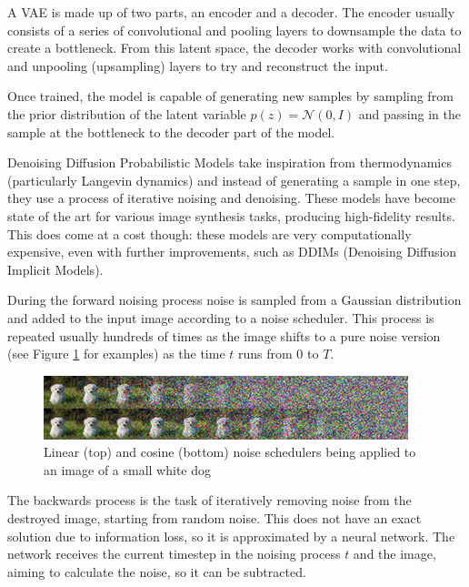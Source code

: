 	A VAE is made up of two parts, an encoder and a decoder. The encoder usually consists of a series of convolutional and pooling layers to downsample the data to create a bottleneck. From this latent space, the decoder works with convolutional and unpooling (upsampling) layers to try and reconstruct the input. 
	
	Once trained, the model is capable of generating new samples by sampling from the prior distribution of the latent variable $p(z) = \mathcal{N}(0,I)$ and passing in the sample at the bottleneck to the decoder part of the model.
	
	Denoising Diffusion Probabilistic Models take inspiration from thermodynamics (particularly Langevin dynamics\cite{welling2011bayesian}) and instead of generating a sample in one step, they use a process of iterative noising and denoising\cite{ho2020denoising}. These models have become state of the art for various image synthesis tasks, producing high-fidelity results. This does come at a cost though: these models are very computationally expensive, even with further improvements, such as DDIMs (Denoising Diffusion Implicit Models\cite{song2020denoising}).
	
	During the forward noising process noise is sampled from a Gaussian distribution and added to the input image according to a noise scheduler. This process is repeated usually hundreds of times as the image shifts to a pure noise version (see Figure \ref{fig:scheduler} for examples) as the time $t$ runs from 0 to $T$.
	
	\begin{figure}[!h]
		\label{fig:scheduler}
		\centering
		\includegraphics[width=\textwidth]{figures/scheduler.png}
		\caption{Linear (top) and cosine (bottom) noise schedulers being applied to an image of a small white dog \cite{nichol2021improved}}
	\end{figure}
	
	
	The backwards process is the task of iteratively removing noise from the destroyed image, starting from random noise. This does not have an exact solution due to information loss, so it is approximated by a neural network. The network receives the current timestep in the noising process $t$ and the image, aiming to calculate the noise, so it can be subtracted.
	
